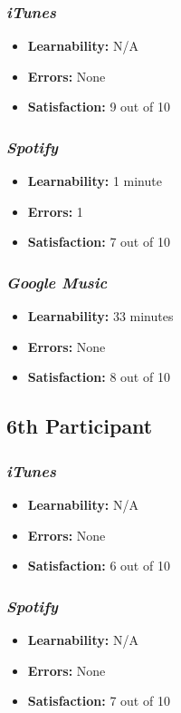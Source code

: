 \documentclass{article}
\begin{document}
\begin{multicols}{2}
\subsubsection{\it iTunes}
\begin{itemize}
	\item {\bf Learnability:} N/A
	\item {\bf Errors:}  None
	\item {\bf Satisfaction:} 9 out of 10 
\end{itemize}

\subsubsection{\it Spotify}
\begin{itemize}
	\item {\bf Learnability:} 1 minute
	\item {\bf Errors:} 1
	\item {\bf Satisfaction:} 7 out of 10 
\end{itemize}

\subsubsection{\it Google Music}
\begin{itemize}
\item {\bf Learnability:} 33 minutes
	\item {\bf Errors:} None
	\item {\bf Satisfaction:} 8 out of 10 
\end{itemize}

\subsection{6th Participant}

\subsubsection{\it iTunes}
\begin{itemize}
	\item {\bf Learnability:} N/A
	\item {\bf Errors:}  None
	\item {\bf Satisfaction:} 6 out of 10 
\end{itemize}

\subsubsection{\it Spotify}
\begin{itemize}
	\item {\bf Learnability:} N/A
	\item {\bf Errors:} None
	\item {\bf Satisfaction:} 7 out of 10 
\end{itemize}


\end{multicols}
\end{document}
